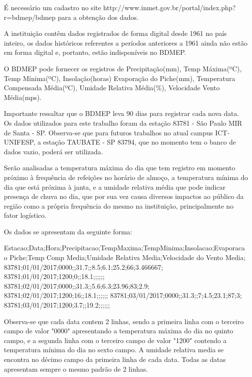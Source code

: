 \documentclass[	12pt, Times, openright, twoside, a4paper, english, brazil]{abntex2}
\begin{document}
          É necessário um cadastro no site http://www.inmet.gov.br/portal/index.php?r=bdmep/bdmep para a obtenção dos dados. 

          A instituição contêm dados registrados de forma digital desde 1961 no país inteiro, os dados históricos referentes a períodos anteriores a 1961 ainda não estão em forma digital e, portanto, estão indisponíveis no BDMEP.

          O BDMEP pode fornecer os registros de Precipitação(mm), Temp Máxima(ºC), Temp Mínima(ºC), Insolação(horas)
          Evaporação do Piche(mm), Temperatura Compensada Média(ºC), Umidade Relativa Média(\%), Velocidade Vento Média(mps).

          Importante ressaltar que o BDMEP leva 90 dias para registrar cada nova data.
          Os dados utilizados para este trabalho foram da estação 83781 - São Paulo MIR de Santa - SP.
          Observa-se que para futuros trabalhos no atual campus ICT-UNIFESP, a estação TAUBATE - SP 83794, que no momento tem o banco de dados vazio, poderá ser utilizada.

          Serão analisadas a temperatura máxima do dia que tem registro em momento próximo à frequência de refeições no horário de almoço, a temperatura mínima do dia que está próxima à janta, e a umidade relativa média que pode indicar presença de chuva no dia, que por sua vez causa diversos impactos ao público da região como a própria frequência do mesmo na instituição, principalmente no fator logístico. 

          Os dados se apresentam da seguinte forma: 
          \begin{algorithm}[H]
          Estacao;Data;Hora;Precipitacao;TempMaxima;TempMinima;Insolacao;Evaporacao Piche;Temp Comp Media;Umidade Relativa Media;Velocidade do Vento Media;
          83781;01/01/2017;0000;;31.7;;8.5;6.1;25.2;66;3.466667;
          83781;01/01/2017;1200;0;;18.1;;;;;;
          83781;02/01/2017;0000;;31.3;;5.6;6.3;23.96;83;2.9;
          83781;02/01/2017;1200;16;;18.1;;;;;;
          83781;03/01/2017;0000;;31.3;;7;4.5;23.1;87;3;
          83781;03/01/2017;1200;3.7;;19.2;;;;;;
          \end{algorithm}

          Observa-se que cada data contem 2 linhas, sendo a primeira linha com o terceiro campo de valor "0000" apresentando a temperatura máxima do dia no quinto campo, e a segunda linha com o terceiro campo de valor "1200" contendo a temperatura mínima do dia no sexto campo.
          A umidade relativa media se encontra no décimo campo da primeira linha de cada data.
          Todas as datas apresentam sempre o mesmo padrão de 2 linhas.
\end{document}
